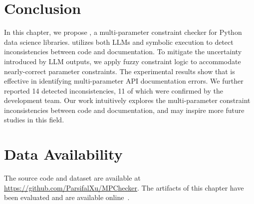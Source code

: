 \section{Conclusion}\label{sec:conclusion-mpchecker}

In this chapter, we propose \toolchecker, a multi-parameter constraint checker for Python data science libraries. \toolchecker utilizes both LLMs and symbolic execution to detect inconsistencies between code and documentation. 
To mitigate the uncertainty introduced by LLM outputs, we apply fuzzy constraint logic to accommodate nearly-correct parameter constraints. The experimental results show that \toolchecker is effective in identifying multi-parameter API documentation errors. We further reported 14 detected inconsistencies, 11 of which were confirmed by the development team.
Our work intuitively explores the multi-parameter constraint inconsistencies between code and documentation, and may inspire more future studies in this field. 


\section{Data Availability}
The source code and dataset are available at \url{https://github.com/ParsifalXu/MPChecker}. The artifacts of this chapter have been evaluated and are available online~\cite{zenodo}.


